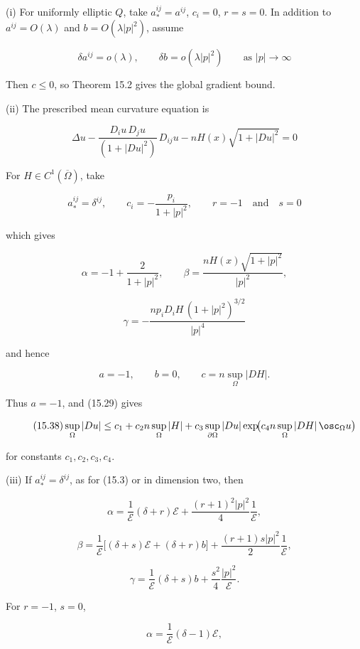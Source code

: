 (i) For uniformly elliptic \(Q\), take \(a_*^{ij}=a^{ij}\), \(c_i=0\),
\(r=s=0\). In addition to \(a^{ij}=O(\lambda)\) and
\(b=O(\lambda|p|^2)\), assume

\begin{equation}
\tag{15.36}
\delta a^{ij}=o(\lambda), \qquad \delta b=o(\lambda|p|^2) \qquad \text{as } |p|\to\infty
\end{equation}

Then \(c\le0\), so Theorem 15.2 gives the global gradient bound.

(ii) The prescribed mean curvature equation is

\begin{equation}
\tag{15.37}
\Delta u-\frac{D_i u\, D_j u}{(1+|Du|^2)}\,D_{ij}u-nH(x)\sqrt{1+|Du|^2}=0
\end{equation}


For \(H\in C^1(\overline\Omega)\), take

\[
a_{*}^{ij}=\delta^{ij}, \qquad c_i=-\frac{p_i}{1+|p|^{2}}, \qquad r=-1 \quad \text{and} \quad s=0
\]

which gives

\[
\alpha=-1+\frac{2}{1+|p|^{2}}, \qquad \beta=\frac{n H(x)\sqrt{1+|p|^{2}}}{|p|^{2}},
\]

\[
\gamma=-\frac{n p_i D_i H \, (1+|p|^{2})^{3/2}}{|p|^{4}}
\]

and hence

\[
a=-1, \qquad b=0, \qquad c=n \sup_{\Omega} |DH|.
\]

Thus \(a=-1\), and (15.29) gives

\[
\tag{15.38}
\sup_{\Omega} |Du| \le c_1 + c_2 n \sup_{\Omega} |H| + c_3 \sup_{\partial\Omega} |Du| \exp\!\bigl(c_4 n \sup_{\Omega} |DH| \, \osc_{\Omega} u\bigr)
\]

for constants \(c_1,c_2,c_3,c_4\).

(iii) If \(a_*^{ij}=\delta^{ij}\), as for (15.3) or in dimension two, then

\[
\alpha=\frac{1}{\mathscr{E}}(\delta+r)\mathscr{E}+\frac{(r+1)^{2}|p|^{2}}{4}\frac{1}{\mathscr{E}},
\]

\[
\tag{15.39}
\beta=\frac{1}{\mathscr{E}}\bigl[(\delta+s)\mathscr{E}+(\delta+r)b\bigr]+\frac{(r+1)s|p|^{2}}{2}\frac{1}{\mathscr{E}},
\]

\[
\gamma=\frac{1}{\mathscr{E}}(\delta+s)b+\frac{s^{2}}{4}\frac{|p|^{2}}{\mathscr{E}}.
\]

For \(r=-1\), \(s=0\),

\[
\alpha=\frac{1}{\mathscr{E}}(\delta-1)\mathscr{E},
\]


